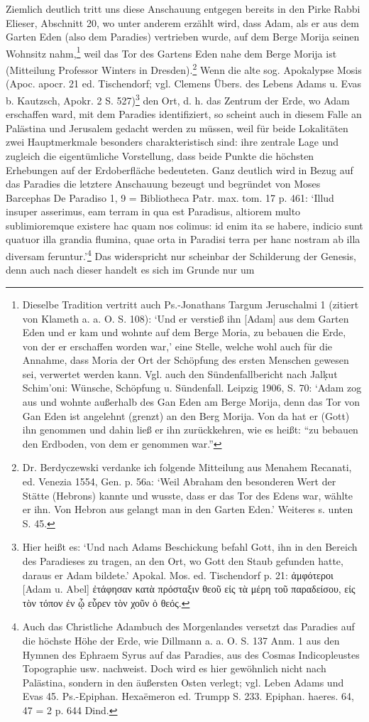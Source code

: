 \documentclass[a4paper, 11pt, oneside]{article}
\begin{document}
Ziemlich deutlich tritt uns diese Anschauung entgegen bereits in den Pirke Rabbi Elieser, Abschnitt 20, wo unter anderem erzählt wird, dass Adam, als er aus dem Garten Eden (also dem Paradies) vertrieben wurde, auf dem Berge Morija seinen Wohnsitz nahm,\footnote{Dieselbe Tradition vertritt auch Ps.-Jonathans Targum Jeruschalmi 1 (zitiert von Klameth a. a. O. S. 108): `Und er verstieß ihn [Adam] aus dem Garten Eden und er kam und wohnte auf dem Berge Moria, zu bebauen die Erde, von der er erschaffen worden war,' eine Stelle, welche wohl auch für die Annahme, dass Moria der Ort der Schöpfung des ersten Menschen gewesen sei, verwertet werden kann. Vgl. auch den Sündenfallbericht nach Jal\d{k}ut Schim'oni: Wünsche, Schöpfung u. Sündenfall. Leipzig 1906, S. 70: `Adam zog aus und wohnte außerhalb des Gan Eden am Berge Morija, denn das Tor von Gan Eden ist angelehnt (grenzt) an den Berg Morija. Von da hat er (Gott) ihn genommen und dahin ließ er ihn zurückkehren, wie es heißt: "`zu bebauen den Erdboden, von dem er genommen war."'} weil das Tor des Gartens Eden nahe dem Berge Morija ist (Mitteilung Professor Winters in Dresden).\footnote{Dr. Berdyczewski verdanke ich folgende Mitteilung aus Menahem Recanati, ed. Venezia 1554, Gen. p. 56a: `Weil Abraham den besonderen Wert der Stätte (Hebrons) kannte und wusste, dass er das Tor des Edens war, wählte er ihn. Von Hebron aus gelangt man in den Garten Eden.' Weiteres s. unten S. 45.} Wenn die alte sog. Apokalypse Mosis (Apoc. apocr. 21 ed. Tischendorf; vgl. Clemens Übers. des Lebens Adams u. Evas b. Kautzsch, Apokr. 2 S. 527)\footnote{Hier heißt es: `Und nach Adams Beschickung befahl Gott, ihn in den Bereich des Paradieses zu tragen, an den Ort, wo Gott den Staub gefunden hatte, daraus er Adam bildete.' Apokal. Mos. ed. Tischendorf p. 21: ἀμφότεροι [Adam u. Abel] ἐτάφησαν κατὰ πρόσταξιν θεοῦ εἰς τὰ μέρη τοῦ παραδείσου, εἰς τὸν τόπον ἐν ᾧ εὗρεν τὸν χοῦν ὁ θεός.} den Ort, d. h. das Zentrum der Erde, wo Adam erschaffen ward, mit dem Paradies identifiziert, so scheint auch in diesem Falle an Palästina und Jerusalem gedacht werden zu müssen, weil für beide Lokalitäten zwei Hauptmerkmale besonders charakteristisch sind: ihre zentrale Lage und zugleich die eigentümliche Vorstellung, dass beide Punkte die höchsten Erhebungen auf der Erdoberfläche bedeuteten. Ganz deutlich wird in Bezug auf das Paradies die letztere Anschauung bezeugt und begründet von Moses Barcephas De Paradiso 1, 9 = Bibliotheca Patr. max. tom. 17 p. 461: `Illud insuper asserimus, eam terram in qua est Paradisus, altiorem multo sublimioremque existere hac quam nos colimus: id enim ita se habere, indicio sunt quatuor illa grandia flumina, quae orta in Paradisi terra per hanc nostram ab illa diversam feruntur.'\footnote{Auch das Christliche Adambuch des Morgenlandes versetzt das Paradies auf die höchste Höhe der Erde, wie Dillmann a. a. O. S. 137 Anm. 1 aus den Hymnen des Ephraem Syrus auf das Paradies, aus des Cosmas Indicopleustes Topographie usw. nachweist. Doch wird es hier gewöhnlich nicht nach Palästina, sondern in den äußersten Osten verlegt; vgl. Leben Adams und Evas 45. Ps.-Epiphan. Hexaëmeron ed. Trumpp S. 233. Epiphan. haeres. 64, 47 = 2 p. 644 Dind.} Das widerspricht nur scheinbar der Schilderung der Genesis, denn auch nach dieser handelt es sich im Grunde nur um 
\end{document}
